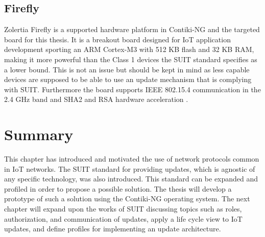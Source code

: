 \documentclass[0-thesis.tex]{subfiles}
\begin{document}
\subsection{Firefly}
\label{ssec:firefly}
Zolertia Firefly is a supported hardware platform in Contiki-NG and the targeted board for
this thesis. It is a breakout board designed for IoT application development sporting an
ARM Cortex-M3 with 512 KB flash and 32 KB RAM, making it more powerful than the Class 1
devices the SUIT standard specifies as a lower bound. This is not an issue but should be
kept in mind as less capable devices are supposed to be able to use an update mechanism
that is complying with SUIT. Furthermore the board supports IEEE 802.15.4 communication in
the 2.4 GHz band and SHA2 and RSA hardware acceleration \parencite{firefly-datasheet}.

\section{Summary}
\label{sec:2-summary}
This chapter has introduced and motivated the use of network protocols common in IoT
networks. The SUIT standard for providing updates, which is agnostic of any specific
technology, was also introduced. This standard can be expanded and profiled in order to
propose a possible solution. The thesis will develop a prototype of such a solution using
the Contiki-NG operating system. The next chapter will expand upon the works of SUIT
discussing topics such as roles, authorization, and communication of updates, apply a life
cycle view to IoT updates, and define profiles for implementing an update architecture.
\end{document}
